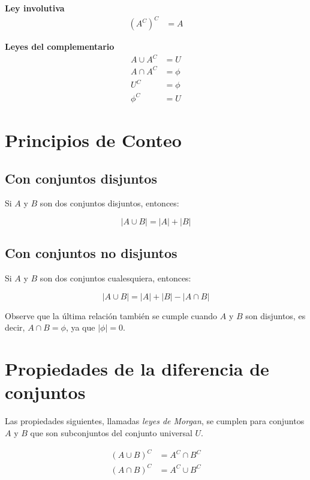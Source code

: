 \documentclass{article}
\begin{document}
\begin{multicols}{2}
        \textbf{Ley involutiva}
        \begin{align}
            (A^C)^C &= A
        \end{align}

        \textbf{Leyes del complementario}
        \begin{subequations}
            \begin{align}
                A \cup A^C &= U\\
                A \cap A^C &= \phi \\
                U^C &= \phi\\
                \phi^C &= U
            \end{align}
        \end{subequations}
        
    \end{multicols}

    \section{Principios de Conteo}

    \subsection{Con conjuntos disjuntos}

    Si $A$ y $B$ son dos conjuntos disjuntos, entonces:

    \begin{equation}
        | A \cup B | = | A | + | B |
    \end{equation}

    \subsection{Con conjuntos no disjuntos}

    Si $A$ y $B$ son dos conjuntos cualesquiera, entonces:

    \begin{equation}
        | A \cup B | = | A | + | B | - | A \cap B |
    \end{equation}

    Observe que la última relación también se cumple cuando $A$ y $B$ son disjuntos, es decir, $A \cap B = \phi$, ya que $|\phi| = 0$.

    \section{Propiedades de la diferencia de conjuntos}

    Las propiedades siguientes, llamadas \textit{leyes de Morgan}, se cumplen para conjuntos $A$ y $B$ que son subconjuntos del conjunto universal $U$.

    \begin{subequations}
        \begin{align}
            (A \cup B)^C &= A^C \cap B^C\\
            (A \cap B)^C &= A^C \cup B^C
        \end{align}
    \end{subequations}

    
\end{document}

